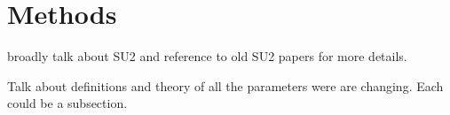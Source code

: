 
\section{Methods}
broadly talk about SU2 and reference to old SU2 papers for more details.

Talk about definitions and theory of all the parameters were are changing. Each could be a subsection.

